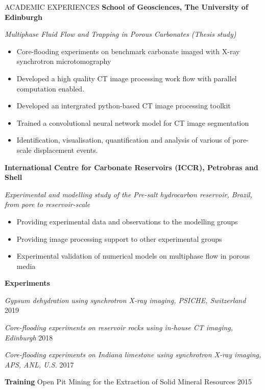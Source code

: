 \documentclass{resume} %
\newenvironment{indentpar}[1]%
  {\begin{list}{}%
          {\setlength{\leftmargin}{#1}}%
          \item[]%
  }
  {\end{list}}
\begin{document}
\begin{rSection}{ACADEMIC EXPERIENCES}
\textbf{School of Geosciences, The University of Edinburgh} 
\begin{indentpar}{0.5cm}
\textit{Multiphase Fluid Flow and Trapping in Porous Carbonates (Thesis study)}
\begin{itemize}
    \item Core-flooding experiments on benchmark carbonate imaged with X-ray synchrotron microtomography
    \item Developed a high quality CT image processing work flow with parallel computation enabled.
    \item Developed an intergrated python-based CT image processing toolkit 
    \item Trained a convolutional neural network model for CT image segmentation
    \item Identification, visualisation, quantification and analysis of various of pore-scale displacement events.
\end{itemize}
\end{indentpar}

\textbf{International Centre for Carbonate Reservoirs (ICCR), Petrobras and Shell} 
\begin{indentpar}{0.5cm}
\textit{Experimental and modelling study of the Pre-salt hydrocarbon reservoir, Brazil, from pore to reservoir-scale}
\begin{itemize}
    \item Providing experimental data and observations to the modelling groups 
    \item Providing image processing support to other experimental groups
    \item Experimental validation of numerical models on multiphase flow in porous media
\end{itemize}
\end{indentpar}
\textbf{Experiments} 

\begin{indentpar}{0.5cm}
\textit{Gypsum dehydration using synchrotron X-ray imaging, PSICHE, Switzerland} \hfill {2019}

\textit{Core-flooding experiments on reservoir rocks using in-house CT imaging, Edinburgh} \hfill {2018}

\textit{Core-flooding experiments on Indiana limestone using synchrotron X-ray imaging, APS, ANL, U.S.} \hfill {2017}
\end{indentpar}

\textbf{Training} Open Pit Mining for the Extraction of Solid Mineral Resources \hfill {2015}


\end{rSection}
\end{document}
